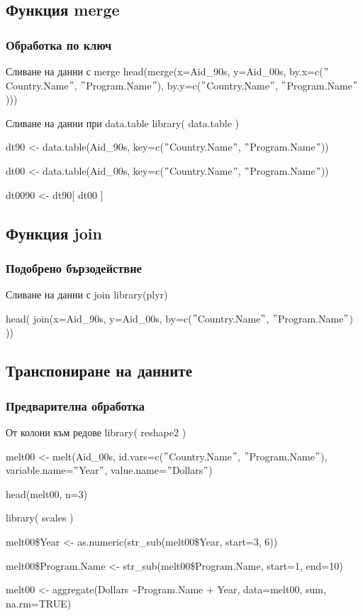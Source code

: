 \documentclass{beamer}
\begin{document}
\subsection{Функция merge}

\begin{frame}
\frametitle{Обработка по ключ}
\begin{block}{Сливане на данни с merge}
head(merge(x=Aid\_90s, y=Aid\_00s, by.x=c($"$Country.Name$"$, $"$Program.Name$"$), by.y=c($"$Country.Name$"$, $"$Program.Name$"$)))
\end{block}

\begin{block}{Сливане на данни при data.table}
library( data.table )

dt90 <- data.table(Aid\_90s, key=c($"$Country.Name$"$, $"$Program.Name$"$))

dt00 <- data.table(Aid\_00s, key=c($"$Country.Name$"$, $"$Program.Name$"$))

dt0090 <- dt90[ dt00 ]
\end{block}
\end{frame}

\subsection{Функция join}

\begin{frame}
\frametitle{Подобрено бързодействие}
\begin{block}{Сливане на данни с join}
library(plyr)

head( join(x=Aid\_90s, y=Aid\_00s, by=c($"$Country.Name$"$, $"$Program.Name$"$) ))
\end{block}
\end{frame}

\subsection{Транспониране на данните}

\begin{frame}
\frametitle{Предварителна обработка}
\begin{block}{От колони към редове}
library( reshape2 )

melt00 <- melt(Aid\_00s, id.vars=c($"$Country.Name$"$, $"$Program.Name$"$), variable.name=$"$Year$"$, value.name=$"$Dollars$"$)

head(melt00, n=3)

library( scales )

melt00\$Year <- as.numeric(str\_sub(melt00\$Year, start=3, 6))

melt00\$Program.Name <- str\_sub(melt00\$Program.Name, start=1, end=10)

melt00 <- aggregate(Dollars \textasciitilde Program.Name + Year, data=melt00, sum, na.rm=TRUE)
\end{block}
\end{frame}
\end{document}
